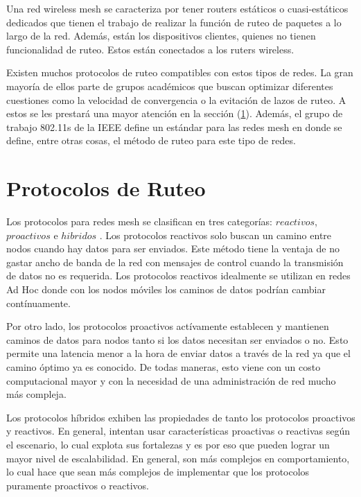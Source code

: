 Una red wireless mesh se caracteriza por tener routers estáticos o cuasi-estáticos dedicados que tienen el trabajo de realizar la función de ruteo de paquetes a lo largo de la red. Además, están los dispositivos clientes, quienes no tienen funcionalidad de ruteo. Estos están conectados a los ruters wireless. 

Existen muchos protocolos de ruteo compatibles con estos tipos de redes. La gran mayoría de ellos parte de grupos académicos que buscan optimizar diferentes cuestiones como la velocidad de convergencia o la evitación de lazos de ruteo. A estos se les prestará una mayor atención en la sección (\ref{SeccionProtocolosDeRuteo}). Además, el grupo de trabajo 802.11s de la IEEE define un estándar para las redes mesh en donde se define, entre otras cosas, el método de ruteo para este tipo de redes.

\section{Protocolos de Ruteo}
\label{SeccionProtocolosDeRuteo}

Los protocolos para redes mesh se clasifican en tres categorías: $reactivos$, $proactivos$ e $hibridos$ \cite{PAPERrealWORLDperformance}. Los protocolos reactivos solo buscan un camino entre nodos cuando hay datos para ser enviados. Este método tiene la ventaja de no gastar ancho de banda de la red con mensajes de control cuando la transmisión de datos no es requerida. Los protocolos reactivos idealmente se utilizan en redes Ad Hoc donde con los nodos móviles los caminos de datos podrían cambiar contínuamente.

Por otro lado, los protocolos proactivos actívamente establecen y mantienen caminos de datos para nodos tanto si los datos necesitan ser enviados o no. Esto permite una latencia menor a la hora de enviar datos a través de la red ya que el camino óptimo ya es conocido. De todas maneras, esto viene con un costo computacional mayor y con la necesidad de una administración de red mucho más compleja.

Los protocolos híbridos exhiben las propiedades de tanto los protocolos proactivos y reactivos. En general, intentan usar características proactivas o reactivas según el escenario, lo cual explota sus fortalezas y es por eso que pueden lograr un mayor nivel de escalabilidad. En general, son más complejos en comportamiento, lo cual hace que sean más complejos de implementar que los protocolos puramente proactivos o reactivos.

